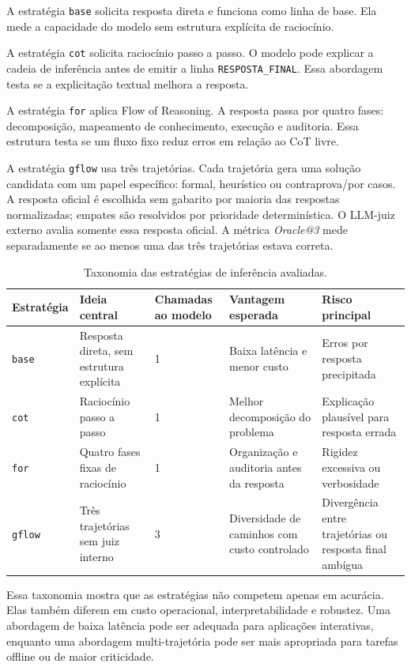 \documentclass[12pt]{article}
\begin{document}
A estratégia \texttt{base} solicita resposta direta e funciona como linha de base. Ela mede a capacidade do modelo sem estrutura explícita de raciocínio.

A estratégia \texttt{cot} solicita raciocínio passo a passo. O modelo pode explicar a cadeia de inferência antes de emitir a linha \texttt{RESPOSTA\_FINAL}. Essa abordagem testa se a explicitação textual melhora a resposta.

A estratégia \texttt{for} aplica Flow of Reasoning. A resposta passa por quatro fases: decomposição, mapeamento de conhecimento, execução e auditoria. Essa estrutura testa se um fluxo fixo reduz erros em relação ao CoT livre.

A estratégia \texttt{gflow} usa três trajetórias. Cada trajetória gera uma solução candidata com um papel específico: formal, heurístico ou contraprova/por casos. A resposta oficial é escolhida sem gabarito por maioria das respostas normalizadas; empates são resolvidos por prioridade determinística. O LLM-juiz externo avalia somente essa resposta oficial. A métrica \textit{Oracle@3} mede separadamente se ao menos uma das três trajetórias estava correta.

\begin{table}[ht]
\centering
\small
\caption{Taxonomia das estratégias de inferência avaliadas.}
\label{tab:estrategias}
\begin{tabular}{|p{2.3cm}|p{2.9cm}|p{2.3cm}|p{2.7cm}|p{2.5cm}|}
\hline
\textbf{Estratégia} & \textbf{Ideia central} & \textbf{Chamadas ao modelo} & \textbf{Vantagem esperada} & \textbf{Risco principal} \\
\hline
\texttt{base} & Resposta direta, sem estrutura explícita & 1 & Baixa latência e menor custo & Erros por resposta precipitada \\
\hline
\texttt{cot} & Raciocínio passo a passo & 1 & Melhor decomposição do problema & Explicação plausível para resposta errada \\
\hline
\texttt{for} & Quatro fases fixas de raciocínio & 1 & Organização e auditoria antes da resposta & Rigidez excessiva ou verbosidade \\
\hline
\texttt{gflow} & Três trajetórias sem juiz interno & 3 & Diversidade de caminhos com custo controlado & Divergência entre trajetórias ou resposta final ambígua \\
\hline
\end{tabular}
\end{table}

Essa taxonomia mostra que as estratégias não competem apenas em acurácia. Elas também diferem em custo operacional, interpretabilidade e robustez. Uma abordagem de baixa latência pode ser adequada para aplicações interativas, enquanto uma abordagem multi-trajetória pode ser mais apropriada para tarefas offline ou de maior criticidade.
\end{document}
